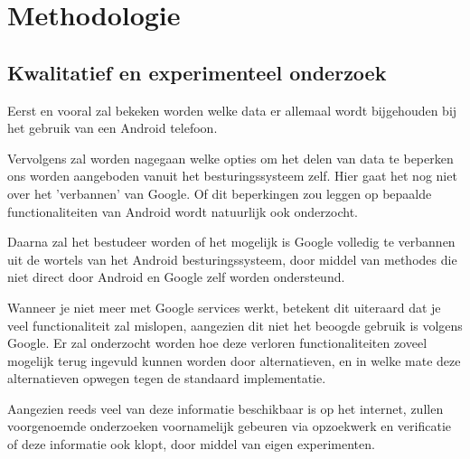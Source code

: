 \section{Methodologie}
\label{sec:methodologie}


\subsection{{Kwalitatief en experimenteel onderzoek}}


Eerst en vooral zal bekeken worden welke data er allemaal wordt bijgehouden bij het gebruik van een Android telefoon.

\vspace{3mm}

\noindent Vervolgens zal worden nagegaan welke opties om het delen van data te beperken ons worden aangeboden vanuit het besturingssysteem zelf. Hier gaat het nog niet over het 'verbannen' van Google. Of dit beperkingen zou leggen op bepaalde functionaliteiten van Android wordt natuurlijk ook onderzocht.

\vspace{3mm}

\noindent Daarna zal het bestudeer worden of het mogelijk is Google volledig te verbannen uit de wortels van het Android besturingssysteem, door middel van methodes die niet direct door Android en Google zelf worden ondersteund.

\vspace{3mm}

\noindent Wanneer je niet meer met Google services werkt, betekent dit uiteraard dat je veel functionaliteit zal mislopen, aangezien dit niet het beoogde gebruik is volgens Google. Er zal onderzocht worden hoe deze verloren functionaliteiten zoveel mogelijk terug ingevuld kunnen worden door alternatieven, en in welke mate deze alternatieven opwegen tegen de standaard implementatie.

\vspace{3mm}

\noindent Aangezien reeds veel van deze informatie beschikbaar is op het internet, zullen voorgenoemde onderzoeken voornamelijk gebeuren via opzoekwerk en verificatie of deze informatie ook klopt, door middel van eigen experimenten.

